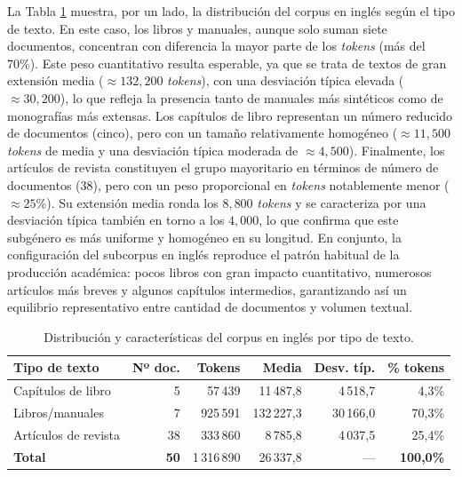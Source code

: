 La Tabla \ref{tab:en_corpus} muestra, por un lado, la distribución del corpus en inglés según el tipo de texto. En este caso, los libros y manuales, aunque solo suman siete documentos, concentran con diferencia la mayor parte de los \textit{tokens} (más del 70\%). Este peso cuantitativo resulta esperable, ya que se trata de textos de gran extensión media ($\approx 132,200$ \textit{tokens}), con una desviación típica elevada ($\approx 30,200$), lo que refleja la presencia tanto de manuales más sintéticos como de monografías más extensas. Los capítulos de libro representan un número reducido de documentos (cinco), pero con un tamaño relativamente homogéneo ($\approx 11,500$ \textit{tokens} de media y una desviación típica moderada de $\approx 4,500$). Finalmente, los artículos de revista constituyen el grupo mayoritario en términos de número de documentos (38), pero con un peso proporcional en \textit{tokens} notablemente menor ($\approx 25$\%). Su extensión media ronda los $8,800$ \textit{tokens} y se caracteriza por una desviación típica también en torno a los $4,000$, lo que confirma que este subgénero es más uniforme y homogéneo en su longitud. En conjunto, la configuración del subcorpus en inglés reproduce el patrón habitual de la producción académica: pocos libros con gran impacto cuantitativo, numerosos artículos más breves y algunos capítulos intermedios, garantizando así un equilibrio representativo entre cantidad de documentos y volumen textual.


\begin{table}[H]
\centering
\fontsize{10}{12}\selectfont
\begin{tabular}{lrrrrr}
\toprule
Tipo de texto & Nº doc. & Tokens & Media & Desv. típ. & \% tokens \\
\midrule
Capítulos de libro & 5&  57\,439& 11\,487,8&  4\,518,7&  4,3\%\\
Libros/manuales    & 7  & 925\,591  & 132\,227,3 & 30\,166,0 & 70,3\% \\
Artículos de revista & 38& 333\,860&  8\,785,8&  4\,037,5& 25,4\%\\
\rowcolor{gray!20}\textbf{Total} & \textbf{50} & 1\,316\,890& 26\,337,8& — & \textbf{100,0\%} \\
\bottomrule
\end{tabular}
\caption{Distribución y características del corpus en inglés por tipo de texto.}
\label{tab:en_corpus}
\end{table}

